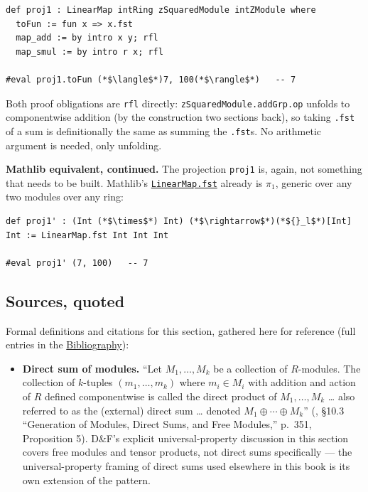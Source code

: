 \begin{lstlisting}
def proj1 : LinearMap intRing zSquaredModule intZModule where
  toFun := fun x => x.fst
  map_add := by intro x y; rfl
  map_smul := by intro r x; rfl

#eval proj1.toFun (*$\langle$*)7, 100(*$\rangle$*)   -- 7
\end{lstlisting}

Both proof obligations are \texttt{rfl} directly: \texttt{zSquaredModule.addGrp.op} unfolds to componentwise addition (by the construction two sections back), so taking \texttt{.fst} of a sum is definitionally the same as summing the \texttt{.fst}s. No arithmetic argument is needed, only unfolding.

\textbf{Mathlib equivalent, continued.} The projection \texttt{proj1} is, again, not something that needs to be built. Mathlib's \href{https://loogle.lean-lang.org/?q=LinearMap.fst}{\texttt{LinearMap.fst}} already is \(\pi_1\), generic over any two modules over any ring:

\begin{lstlisting}
def proj1' : (Int (*$\times$*) Int) (*$\rightarrow$*)(*${}_l$*)[Int] Int := LinearMap.fst Int Int Int

#eval proj1' (7, 100)   -- 7
\end{lstlisting}

\subsection{Sources, quoted}\label{sec:10-modules:06-direct-sums:3}

Formal definitions and citations for this section, gathered here for reference (full entries in the \hyperref[sec:root:bibliography:1]{Bibliography}):

\begin{itemize}
\tightlist
\item
  \textbf{Direct sum of modules.} ``Let \(M_1, \ldots, M_k\) be a collection of \(R\)-modules. The collection of \(k\)-tuples \((m_1, \ldots, m_k)\) where \(m_i \in M_i\) with addition and action of \(R\) defined componentwise is called the direct product of \(M_1, \ldots, M_k\) \ldots{} also referred to as the (external) direct sum \ldots{} denoted \(M_1 \oplus \cdots \oplus M_k\)'' (\cite{DummitFoote2003}, §10.3 ``Generation of Modules, Direct Sums, and Free Modules,'' p.~351, Proposition 5). D\&F's explicit universal-property discussion in this section covers free modules and tensor products, not direct sums specifically --- the universal-property framing of direct sums used elsewhere in this book is its own extension of the pattern.
\end{itemize}

